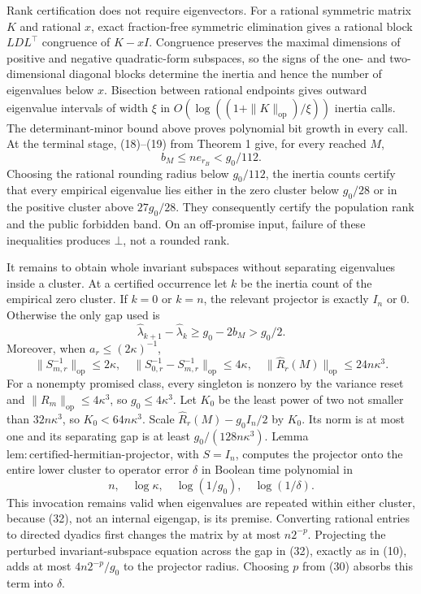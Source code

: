Rank certification does not require eigenvectors.  For a rational symmetric matrix \(K\) and rational \(x\), exact fraction-free symmetric elimination gives a rational block \(LDL^{\top}\) congruence of \(K-xI\).  Congruence preserves the maximal dimensions of positive and negative quadratic-form subspaces, so the signs of the one- and two-dimensional diagonal blocks determine the inertia and hence the number of eigenvalues below \(x\).  Bisection between rational endpoints gives outward eigenvalue intervals of width \(\xi\) in \(O(\log((1+\|K\|_{\mathrm{op}})/\xi))\) inertia calls.  The determinant-minor bound above proves polynomial bit growth in every call.  At the terminal stage, (18)--(19) from Theorem 1 give, for every reached \(M\),
\[
 b_M\le ne_{r_B}<g_0/112.
 \tag{31}
\]
Choosing the rational rounding radius below \(g_0/112\), the inertia counts certify that every empirical eigenvalue lies either in the zero cluster below \(g_0/28\) or in the positive cluster above \(27g_0/28\).  They consequently certify the population rank and the public forbidden band.  On an off-promise input, failure of these inequalities produces \(\bot\), not a rounded rank.

It remains to obtain whole invariant subspaces without separating eigenvalues inside a cluster.  At a certified occurrence let \(k\) be the inertia count of the empirical zero cluster.  If \(k=0\) or \(k=n\), the relevant projector is exactly \(I_n\) or \(0\).  Otherwise the only gap used is
\[
 \widehat\lambda_{k+1}-\widehat\lambda_k
 \ge g_0-2b_M>g_0/2.
 \tag{32}
\]
Moreover, when \(a_r\le(2\kappa)^{-1}\),
\[
 \|S_{m,r}^{-1}\|_{\mathrm{op}}\le2\kappa,
 \quad
 \|S_{0,r}^{-1}-S_{m,r}^{-1}\|_{\mathrm{op}}\le4\kappa,
 \quad
 \|\widehat R_r(M)\|_{\mathrm{op}}\le24n\kappa^3.
 \tag{33}
\]
For a nonempty promised class, every singleton is nonzero by the variance reset and \(\|R_m\|_{\mathrm{op}}\le4\kappa^3\), so \(g_0\le4\kappa^3\).  Let \(K_0\) be the least power of two not smaller than \(32n\kappa^3\), so \(K_0<64n\kappa^3\).  Scale \(\widehat R_r(M)-g_0I_n/2\) by \(K_0\).  Its norm is at most one and its separating gap is at least \(g_0/(128n\kappa^3)\).  Lemma \(\mathrm{lem{:}certified\mbox{-}hermitian\mbox{-}projector}\), with \(S=I_n\), computes the projector onto the entire lower cluster to operator error \(\delta\) in Boolean time polynomial in
\[
 n,\quad \log\kappa,\quad \log(1/g_0),\quad \log(1/\delta).
 \tag{34}
\]
This invocation remains valid when eigenvalues are repeated within either cluster, because (32), not an internal eigengap, is its premise.  Converting rational entries to directed dyadics first changes the matrix by at most \(n2^{-p}\).  Projecting the perturbed invariant-subspace equation across the gap in (32), exactly as in (10), adds at most \(4n2^{-p}/g_0\) to the projector radius.  Choosing \(p\) from (30) absorbs this term into \(\delta\).

